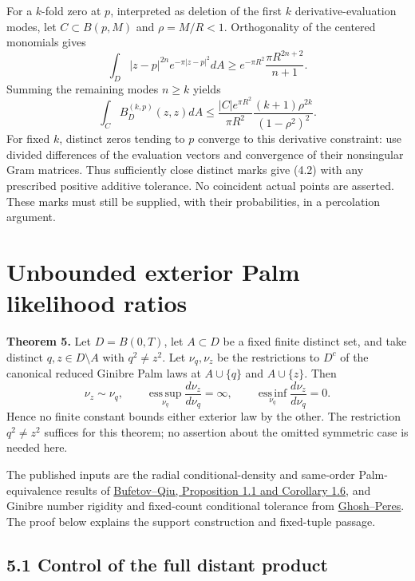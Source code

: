 \documentclass[11pt,a4paper]{article}
\theoremstyle{definition}
\theoremstyle{remark}
\numberwithin{equation}{section}
\begin{document}
For a \(k\)-fold zero at \(p\), interpreted as deletion of the first \(k\) derivative-evaluation modes, let \(C\subset B(p,M)\) and \(\rho=M/R<1\). Orthogonality of the centered monomials gives \[
\int_D|z-p|^{2n}e^{-\pi|z-p|^2}dA
\ge e^{-\pi R^2}\frac{\pi R^{2n+2}}{n+1}.
\] Summing the remaining modes \(n\ge k\) yields \[
\boxed{\quad
\int_C B_D^{(k,p)}(z,z)dA
\le
\frac{|C|e^{\pi R^2}}{\pi R^2}
\frac{(k+1)\rho^{2k}}{(1-\rho^2)^2}.
\quad}
\tag{4.2}
\] For fixed \(k\), distinct zeros tending to \(p\) converge to this derivative constraint: use divided differences of the evaluation vectors and convergence of their nonsingular Gram matrices. Thus sufficiently close distinct marks give (4.2) with any prescribed positive additive tolerance. No coincident actual points are asserted. These marks must still be supplied, with their probabilities, in a percolation argument.

\hypertarget{unbounded-exterior-palm-likelihood-ratios}{%
\section{Unbounded exterior Palm likelihood ratios}\label{unbounded-exterior-palm-likelihood-ratios}}

\textbf{Theorem 5.} Let \(D=B(0,T)\), let \(A\subset D\) be a fixed finite distinct set, and take distinct \(q,z\in D\setminus A\) with \(q^2\ne z^2\). Let \(\nu_q,\nu_z\) be the restrictions to \(D^c\) of the canonical reduced Ginibre Palm laws at \(A\cup\{q\}\) and \(A\cup\{z\}\). Then \[
\nu_z\sim\nu_q,\qquad
\operatorname*{ess\,sup}_{\nu_q}\frac{d\nu_z}{d\nu_q}=\infty,
\qquad
\operatorname*{ess\,inf}_{\nu_q}\frac{d\nu_z}{d\nu_q}=0.
\tag{5.1}
\] Hence no finite constant bounds either exterior law by the other. The restriction \(q^2\ne z^2\) suffices for this theorem; no assertion about the omitted symmetric case is needed here.

The published inputs are the radial conditional-density and same-order Palm-equivalence results of \href{https://arxiv.org/html/1608.03736v2}{Bufetov--Qiu, Proposition 1.1 and Corollary 1.6}, and Ginibre number rigidity and fixed-count conditional tolerance from \href{https://arxiv.org/abs/1211.2381}{Ghosh--Peres}. The proof below explains the support construction and fixed-tuple passage.

\hypertarget{control-of-the-full-distant-product}{%
\subsection{5.1 Control of the full distant product}\label{control-of-the-full-distant-product}}
\end{document}
